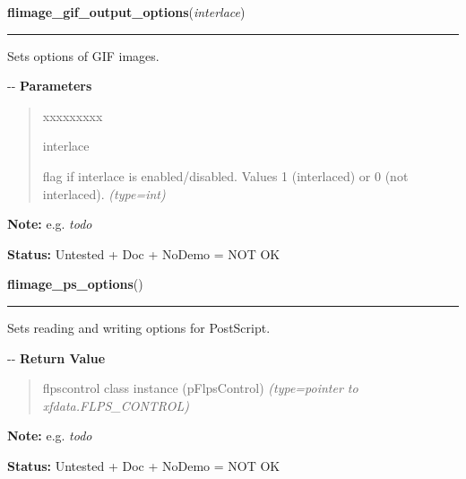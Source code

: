 \hspace{.8\funcindent}\begin{boxedminipage}{\funcwidth}

    \raggedright \textbf{flimage\_gif\_output\_options}(\textit{interlace})

    \vspace{-1.5ex}

    \rule{\textwidth}{0.5\fboxrule}
\setlength{\parskip}{2ex}

Sets options of GIF images.

-{}-
\setlength{\parskip}{1ex}
      \textbf{Parameters}
      \vspace{-1ex}

      \begin{quote}
        \begin{Ventry}{xxxxxxxxx}

          \item[interlace]


flag if interlace is enabled/disabled. Values 1 (interlaced) or 0
(not interlaced).
            {\it (type=int)}

        \end{Ventry}

      \end{quote}

\textbf{Note:} 
e.g. \emph{todo}


\textbf{Status:} 
Untested + Doc + NoDemo = NOT OK


    \end{boxedminipage}

    \label{xformslib:flflimage:flimage_ps_options}

    \vspace{0.5ex}

\hspace{.8\funcindent}\begin{boxedminipage}{\funcwidth}

    \raggedright \textbf{flimage\_ps\_options}()

    \vspace{-1.5ex}

    \rule{\textwidth}{0.5\fboxrule}
\setlength{\parskip}{2ex}

Sets reading and writing options for PostScript.

-{}-
\setlength{\parskip}{1ex}
      \textbf{Return Value}
    \vspace{-1ex}

      \begin{quote}

flpscontrol class instance (pFlpsControl)
      {\it (type=pointer to xfdata.FLPS\_CONTROL)}

      \end{quote}

\textbf{Note:} 
e.g. \emph{todo}


\textbf{Status:} 
Untested + Doc + NoDemo = NOT OK


    \end{boxedminipage}

